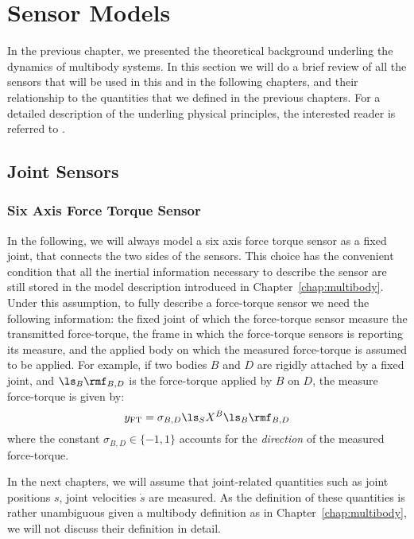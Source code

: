 \section{Sensor Models}
\label{sec:sensorModels}
In the previous chapter, we presented the theoretical background underling the dynamics of multibody systems.
In this section we will do a brief review of all the sensors that will be used in this and in the following chapters, and their relationship to the quantities that we defined in the previous chapters. For a detailed description of the underling physical principles, the interested reader is referred to \citep[Chapter 4]{doebelin2003}. 

\subsection{Joint Sensors}
\subsubsection{Six Axis Force Torque Sensor}
In the following, we will always model a six axis force torque sensor as a fixed joint,
that connects the two sides of the sensors.  This choice has the convenient condition that all the inertial information necessary to describe the sensor are still stored in the model description introduced in Chapter~\ref{chap:multibody}. Under this assumption, to fully describe a force-torque sensor we need the following information: the fixed joint of which the force-torque sensor measure the transmitted force-torque, the frame in which the force-torque sensors is reporting its measure, and the applied body on which the measured force-torque is assumed to be applied. For example, if two bodies $B$ and $D$ are rigidly attached by a fixed joint, and $\ls_B \rmf_{B,D}$ is the force-torque applied by $B$ on $D$, the measure force-torque is given by:
\begin{equation}
\label{eq:six-axis-ft-sensor}
y_{\text{FT}} = \sigma_{B,D} \ls_S X^B \ls_B \rmf_{B,D}
\end{equation}
where the constant $\sigma_{B,D} \in \{-1,1\}$ accounts for the \emph{direction} of the measured force-torque. 
\begin{remark}
In the next chapters, we will assume that joint-related quantities such as joint positions $s$, joint velocities $\dot{s}$ are measured. As the definition of these quantities is rather unambiguous given a multibody definition as in Chapter~\ref{chap:multibody}, we will not discuss their definition in detail. 
\end{remark}

